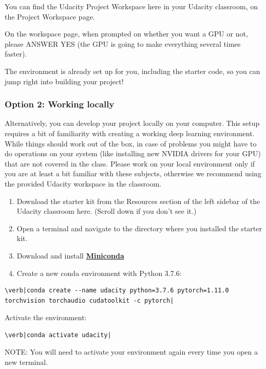 You can find the Udacity Project Workspace here in your Udacity classroom, on the Project Workspace page.

On the workspace page, when prompted on whether you want a GPU or not, please ANSWER YES (the GPU is going to make everything several times faster).

The environment is already set up for you, including the starter code, so you can jump right into building your project!

\subsubsection{Option 2: Working locally}

Alternatively, you can develop your project locally on your computer. This setup requires a bit of familiarity with creating a working deep learning environment. While things should work out of the box, in case of problems you might have to do operations on your system (like installing new NVIDIA drivers for your GPU) that are not covered in the class. Please work on your local environment only if you are at least a bit familiar with these subjects, otherwise we recommend using the provided Udacity workspace in the classroom.

\begin{enumerate}
    \item Download the starter kit from the Resources section of the left sidebar of the Udacity classroom here. (Scroll down if you don't see it.)
    \item Open a terminal and navigate to the directory where you installed the starter kit.
    \item Download and install \href{https://docs.conda.io/en/latest/miniconda.html}{\textbf{Miniconda}}
    \item Create a new conda environment with Python 3.7.6:
\end{enumerate}

\begin{verbatim}
\verb|conda create --name udacity python=3.7.6 pytorch=1.11.0 torchvision torchaudio cudatoolkit -c pytorch|
\end{verbatim}

Activate the environment:

\begin{verbatim}
\verb|conda activate udacity|
\end{verbatim}

NOTE: You will need to activate your environment again every time you open a new terminal.

